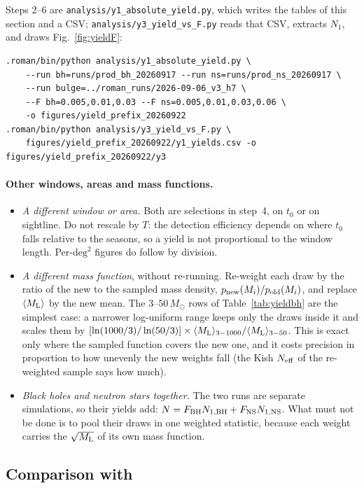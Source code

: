 \documentclass[english,10pt,a4paper]{article}
\newcommand{\Ml}{M_{\rm L}}
\newcommand{\Msun}{M_\odot}
\newcommand{\Neff}{N_{\rm eff}}
\begin{document}
Steps 2--6 are \texttt{analysis/y1\_absolute\_yield.py}, which writes the tables of this section
and a CSV; \texttt{analysis/y3\_yield\_vs\_F.py} reads that CSV, extracts $N_1$, and draws
Fig.~\ref{fig:yieldF}:

\begin{verbatim}
.roman/bin/python analysis/y1_absolute_yield.py \
    --run bh=runs/prod_bh_20260917 --run ns=runs/prod_ns_20260917 \
    --run bulge=../roman_runs/2026-09-06_v3_h7 \
    --F bh=0.005,0.01,0.03 --F ns=0.005,0.01,0.03,0.06 \
    -o figures/yield_prefix_20260922
.roman/bin/python analysis/y3_yield_vs_F.py \
    figures/yield_prefix_20260922/y1_yields.csv -o figures/yield_prefix_20260922/y3
\end{verbatim}

\paragraph{Other windows, areas and mass functions.}
\begin{itemize}
\item \emph{A different window or area.} Both are selections in step~4, on $t_0$ or on sightline.
  Do not rescale by $T$: the detection efficiency depends on where $t_0$ falls relative to the
  seasons, so a yield is not proportional to the window length. Per-$\mathrm{deg}^2$ figures do
  follow by division.
\item \emph{A different mass function}, without re-running. Re-weight each draw by the ratio of
  the new to the sampled mass density, $p_{\rm new}(M_i)/p_{\rm old}(M_i)$, and replace
  $\langle\Ml\rangle$ by the new mean. The $3$--$50\,\Msun$ rows of Table~\ref{tab:yieldbh} are the
  simplest case: a narrower log-uniform range keeps only the draws inside it and scales them by
  $[\ln(1000/3)/\ln(50/3)]\times\langle\Ml\rangle_{3-1000}/\langle\Ml\rangle_{3-50}$. This is
  exact only where the sampled function covers the new one, and it costs precision in proportion
  to how unevenly the new weights fall (the Kish $\Neff$ of the re-weighted sample says how much).
\item \emph{Black holes and neutron stars together.} The two runs are separate simulations, so
  their yields add: $N = F_{\rm BH}N_{1,\rm BH} + F_{\rm NS}N_{1,\rm NS}$. What must not be done is
  to pool their draws in one weighted statistic, because each weight carries the $\sqrt{\Ml}$ of
  its own mass function.
\end{itemize}

\subsection{Comparison with \texorpdfstring{\citet{SajadianSahu2023}}{Sajadian \& Sahu (2023)}}
\end{document}
